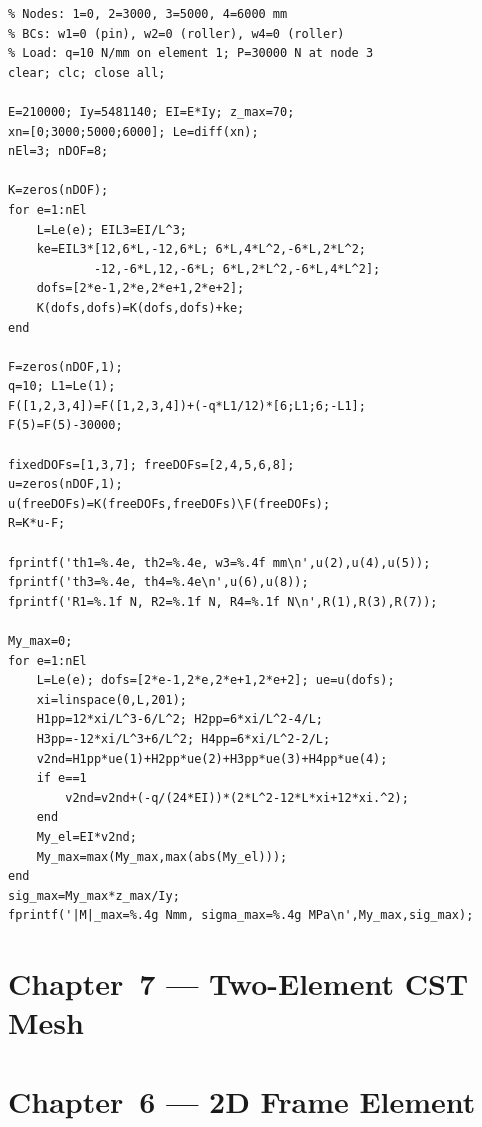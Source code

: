 \begin{lstlisting}[caption={Three-element continuous beam (Chapter~\ref{ch:beam})},
                   label={code:beam_3elem}]
% fem_beam_3elem.m -- Chapter 5: 3-element continuous beam
% Nodes: 1=0, 2=3000, 3=5000, 4=6000 mm
% BCs: w1=0 (pin), w2=0 (roller), w4=0 (roller)
% Load: q=10 N/mm on element 1; P=30000 N at node 3
clear; clc; close all;

E=210000; Iy=5481140; EI=E*Iy; z_max=70;
xn=[0;3000;5000;6000]; Le=diff(xn);
nEl=3; nDOF=8;

K=zeros(nDOF);
for e=1:nEl
    L=Le(e); EIL3=EI/L^3;
    ke=EIL3*[12,6*L,-12,6*L; 6*L,4*L^2,-6*L,2*L^2;
            -12,-6*L,12,-6*L; 6*L,2*L^2,-6*L,4*L^2];
    dofs=[2*e-1,2*e,2*e+1,2*e+2];
    K(dofs,dofs)=K(dofs,dofs)+ke;
end

F=zeros(nDOF,1);
q=10; L1=Le(1);
F([1,2,3,4])=F([1,2,3,4])+(-q*L1/12)*[6;L1;6;-L1];
F(5)=F(5)-30000;

fixedDOFs=[1,3,7]; freeDOFs=[2,4,5,6,8];
u=zeros(nDOF,1);
u(freeDOFs)=K(freeDOFs,freeDOFs)\F(freeDOFs);
R=K*u-F;

fprintf('th1=%.4e, th2=%.4e, w3=%.4f mm\n',u(2),u(4),u(5));
fprintf('th3=%.4e, th4=%.4e\n',u(6),u(8));
fprintf('R1=%.1f N, R2=%.1f N, R4=%.1f N\n',R(1),R(3),R(7));

My_max=0;
for e=1:nEl
    L=Le(e); dofs=[2*e-1,2*e,2*e+1,2*e+2]; ue=u(dofs);
    xi=linspace(0,L,201);
    H1pp=12*xi/L^3-6/L^2; H2pp=6*xi/L^2-4/L;
    H3pp=-12*xi/L^3+6/L^2; H4pp=6*xi/L^2-2/L;
    v2nd=H1pp*ue(1)+H2pp*ue(2)+H3pp*ue(3)+H4pp*ue(4);
    if e==1
        v2nd=v2nd+(-q/(24*EI))*(2*L^2-12*L*xi+12*xi.^2);
    end
    My_el=EI*v2nd;
    My_max=max(My_max,max(abs(My_el)));
end
sig_max=My_max*z_max/Iy;
fprintf('|M|_max=%.4g Nmm, sigma_max=%.4g MPa\n',My_max,sig_max);
\end{lstlisting}

\section{Chapter~7 --- Two-Element CST Mesh}
\label{lst:cst2d}



\section*{Chapter~6 --- 2D Frame Element}

